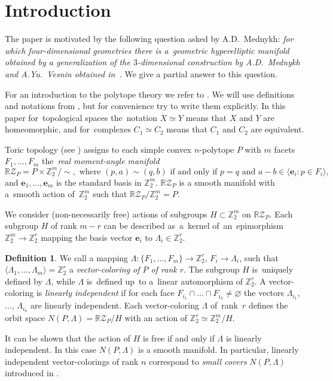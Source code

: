 \documentclass[12pt]{amsart}
\theoremstyle{definition}
\newtheorem{definition}[formula]{Definition}
\theoremstyle{remark}
\begin{document}
\section{Introduction}

The paper is motivated by the following question asked by A.D.~Mednykh:
{\it for which four-dimensional geometries there is a~geometric hyperelliptic manifold obtained by a generalization of 
the $3$-dimensional construction by A.D.~Mednykh and A.Yu.~Vesnin \cite{M90, VM99M, VM99S2} obtained in~\cite{E24}.} 
We give a partial answer to this question. 

For an introduction to the polytope theory we refer to \cite{Gb03, Z95}. We will use definitions and notations
from \cite{E24}, but for convenience try to write them explicitly. In this paper for~topological spaces 
the~notation $X\simeq Y$ means that $X$ and $Y$ are homeomorphic, and for~complexes $C_1\simeq C_2$ 
means that $C_1$ and $C_2$ are equivalent.

Toric topology (see \cite{BP15,DJ91}) assigns to each simple convex $n$-polytope $P$ with $m$ facets  $F_1,\dots, F_m$
the~{\it real moment-angle manifold} 
$$
\mathbb R\mathcal{Z}_P=P\times \mathbb Z_2^m/\sim, 
\text{ where }(p,a)\sim(q,b)\text{ if and only if }p=q \text{ and }a-b\in\langle \boldsymbol{e}_i\colon p\in F_i\rangle,
$$ 
and $\boldsymbol{e}_1,\dots, \boldsymbol{e}_m$ is the standard basis in $\mathbb Z_2^m$.
$\mathbb R\mathcal{Z}_P$ is a smooth manifold with a~smooth action of~$\mathbb Z_2^m$ 
such that $\mathbb R\mathcal{Z}_P/\mathbb Z_2^m=P$.

We consider  (non-necessarily free) actions of subgroups $H\subset \mathbb Z_2^m$ on  $\mathbb R\mathcal{Z}_P$.  
Each subgroup $H$ of rank $m-r$ can be described as~a~kernel of~an~epimorphism $\mathbb Z_2^m\to\mathbb Z_2^r$
mapping the basis vector $\boldsymbol{e}_i$ to $\Lambda_i\in\mathbb Z_2^r$.
\begin{definition}
We call a mapping $\Lambda\colon \{F_1,\dots,F_m\}\to \mathbb Z_2^r$, $F_i\to \Lambda_i$,
such that $\langle \Lambda_1,\dots,\Lambda_m\rangle=\mathbb Z_2^r$ a {\it vector-coloring of $P$ of rank $r$}.
The subgroup  $H$ is~uniquely defined by $\Lambda$, while $\Lambda$ is~defined up~to
a~linear automorphism of $\mathbb Z_2^r$. A vector-coloring is {\it linearly independent} if for each 
face $F_{i_1}\cap \dots\cap F_{i_k}\ne\varnothing$ the vectors $\Lambda_{i_1}$, $\dots$, $\Lambda_{i_k}$
are linearly independent. Each vector-coloring $\Lambda$ of~rank~$r$ defines the orbit space
$N(P,\Lambda)=\mathbb R\mathcal{Z}_P/H$ with an action of $\mathbb Z_2^r\simeq \mathbb Z_2^m/H$.
\end{definition}
It can be shown that the action of $H$ is free if and only if $\Lambda$ is linearly independent. 
In this case $N(P,\Lambda)$ is a smooth manifold. In particular, 
linearly independent vector-colorings of rank $n$ 
correspond to {\it small covers} $N(P,\Lambda)$ introduced in \cite{DJ91}. 
\end{document}

